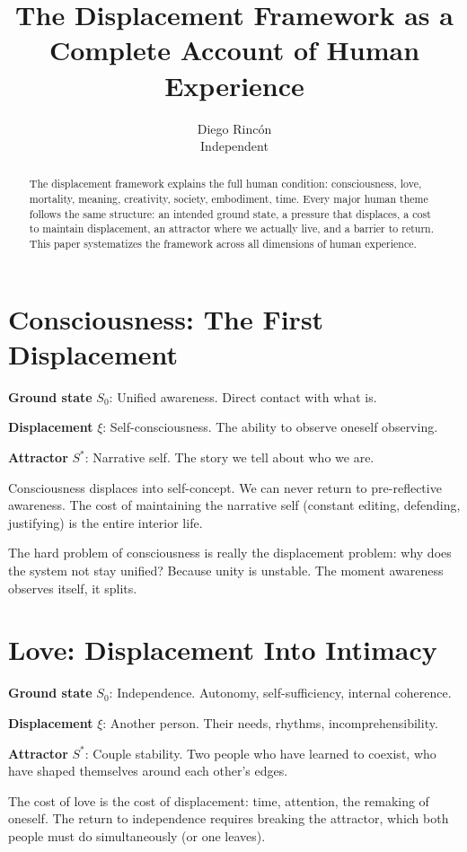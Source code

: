 \documentclass[12pt]{article}
\title{The Displacement Framework as a Complete Account of Human Experience}
\author{Diego Rincón\\
\small Independent}
\date{}
\theoremstyle{definition}
\theoremstyle{remark}
\begin{document}
\maketitle

\begin{abstract}
The displacement framework explains the full human condition: consciousness, love, mortality, meaning, creativity, society, embodiment, time. Every major human theme follows the same structure: an intended ground state, a pressure that displaces, a cost to maintain displacement, an attractor where we actually live, and a barrier to return. This paper systematizes the framework across all dimensions of human experience.
\end{abstract}

\section{Consciousness: The First Displacement}

\textbf{Ground state} $S_0$: Unified awareness. Direct contact with what is.

\textbf{Displacement} $\xi$: Self-consciousness. The ability to observe oneself observing.

\textbf{Attractor} $S^*$: Narrative self. The story we tell about who we are.

Consciousness displaces into self-concept. We can never return to pre-reflective awareness. The cost of maintaining the narrative self (constant editing, defending, justifying) is the entire interior life.

The hard problem of consciousness is really the displacement problem: why does the system not stay unified? Because unity is unstable. The moment awareness observes itself, it splits.

\section{Love: Displacement Into Intimacy}

\textbf{Ground state} $S_0$: Independence. Autonomy, self-sufficiency, internal coherence.

\textbf{Displacement} $\xi$: Another person. Their needs, rhythms, incomprehensibility.

\textbf{Attractor} $S^*$: Couple stability. Two people who have learned to coexist, who have shaped themselves around each other's edges.

The cost of love is the cost of displacement: time, attention, the remaking of oneself. The return to independence requires breaking the attractor, which both people must do simultaneously (or one leaves).
\end{document}
